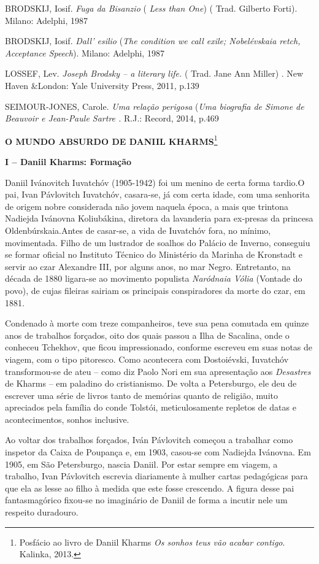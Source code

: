BRODSKIJ, Iosif. \emph{Fuga da Bisanzio} ( \emph{Less than One}) ( Trad.
Gilberto Forti). Milano: Adelphi, 1987

BRODSKIJ, Iosif. \emph{Dall' esilio} (\emph{The condition we call exile;
Nobelévskaia retch, Acceptance Speech}). Milano: Adelphi, 1987

LOSSEF, Lev. \emph{Joseph Brodsky -- a literary life.} ( Trad. Jane Ann
Miller) . New Haven \&London: Yale University Press, 2011, p.139

SEIMOUR-JONES, Carole. \emph{Uma relação perigosa} (\emph{Uma biografia
de Simone de Beauvoir e Jean-Paule Sartre .} R.J.: Record, 2014, p.469

\textbf{O MUNDO ABSURDO DE DANIIL
KHARMS}\protect\hypertarget{_Hlk490065696}{}{}\footnote{Posfácio ao
  livro de Daniil Kharms \emph{Os sonhos teus vão acabar contigo}.
  Kalinka, 2013.}

\textbf{I -- Daniil Kharms: Formação}

Daniil Ivánovitch Iuvatchóv (1905-1942) foi um menino de certa forma
tardio.O pai, Ivan Pávlovitch Iuvatchóv, casara-se, já com certa idade,
com uma senhorita de origem nobre considerada não jovem naquela época, a
mais que trintona Nadiejda Ivánovna Koliubákina, diretora da lavanderia
para ex-presas da princesa Oldenbúrskaia.Antes de casar-se, a vida de
Iuvatchóv fora, no mínimo, movimentada. Filho de um lustrador de soalhos
do Palácio de Inverno, conseguiu se formar oficial no Instituto Técnico
do Ministério da Marinha de Kronstadt e servir ao czar Alexandre III,
por alguns anos, no mar Negro. Entretanto, na década de 1880 ligara-se
ao movimento populista \emph{Naródnaia Vólia} (Vontade do povo), de
cujas fileiras sairiam os principais conspiradores da morte do czar, em
1881.

Condenado à morte com treze companheiros, teve sua pena comutada em
quinze anos de trabalhos forçados, oito dos quais passou a Ilha de
Sacalina, onde o conheceu Tchekhov, que ficou impressionado, conforme
escreveu em suas notas de viagem, com o tipo pitoresco. Como acontecera
com Dostoiévski, Iuvatchóv transformou-se de ateu -- como diz Paolo Nori
em sua apresentação aos \emph{Desastres} de Kharms -- em paladino do
cristianismo. De volta a Petersburgo, ele deu de escrever uma série de
livros tanto de memórias quanto de religião, muito apreciados pela
família do conde Tolstói, meticulosamente repletos de datas e
acontecimentos, sonhos inclusive.

Ao voltar dos trabalhos forçados, Iván Pávlovitch começou a trabalhar
como inspetor da Caixa de Poupança e, em 1903, casou-se com Nadiejda
Ivánovna. Em 1905, em São Petersburgo, nascia Daniil. Por estar sempre
em viagem, a trabalho, Ivan Pávlovitch escrevia diariamente à mulher
cartas pedagógicas para que ela as lesse ao filho à medida que este
fosse crescendo. A figura desse pai fantasmagórico fixou-se no
imaginário de Daniil de forma a incutir nele um respeito duradouro.

